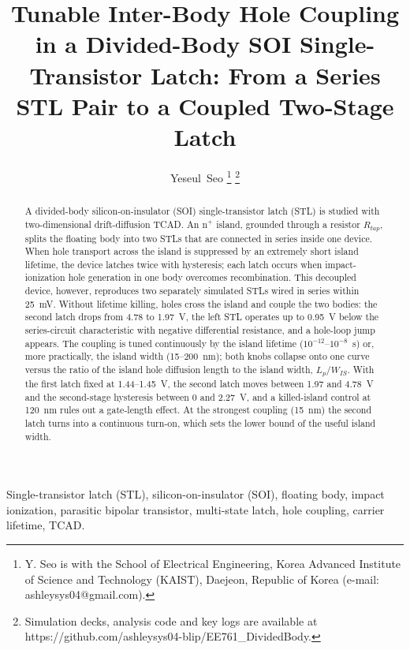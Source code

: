 \documentclass[journal]{IEEEtran}
\begin{document}
\title{Tunable Inter-Body Hole Coupling in a Divided-Body SOI Single-Transistor Latch: From a Series STL Pair to a Coupled Two-Stage Latch}

\author{Yeseul~Seo%
\thanks{Y. Seo is with the School of Electrical Engineering, Korea Advanced Institute of Science and Technology (KAIST), Daejeon, Republic of Korea (e-mail: ashleysys04@gmail.com).}%
\thanks{Simulation decks, analysis code and key logs are available at https://github.com/ashleysys04-blip/EE761\_DividedBody.}}

\maketitle

\begin{abstract}
A divided-body silicon-on-insulator (SOI) single-transistor latch (STL) is studied with two-dimensional drift-diffusion TCAD. An n$^+$ island, grounded through a resistor $R_{tap}$, splits the floating body into two STLs that are connected in series inside one device. When hole transport across the island is suppressed by an extremely short island lifetime, the device latches twice with hysteresis; each latch occurs when impact-ionization hole generation in one body overcomes recombination. This decoupled device, however, reproduces two separately simulated STLs wired in series within 25~mV. Without lifetime killing, holes cross the island and couple the two bodies: the second latch drops from 4.78 to 1.97~V, the left STL operates up to 0.95~V below the series-circuit characteristic with negative differential resistance, and a hole-loop jump appears. The coupling is tuned continuously by the island lifetime ($10^{-12}$--$10^{-8}$~s) or, more practically, the island width (15--200~nm); both knobs collapse onto one curve versus the ratio of the island hole diffusion length to the island width, $L_p/W_{IS}$. With the first latch fixed at 1.44--1.45~V, the second latch moves between 1.97 and 4.78~V and the second-stage hysteresis between 0 and 2.27~V, and a killed-island control at 120~nm rules out a gate-length effect. At the strongest coupling (15~nm) the second latch turns into a continuous turn-on, which sets the lower bound of the useful island width.
\end{abstract}

\begin{IEEEkeywords}
Single-transistor latch (STL), silicon-on-insulator (SOI), floating body, impact ionization, parasitic bipolar transistor, multi-state latch, hole coupling, carrier lifetime, TCAD.
\end{IEEEkeywords}
\end{document}
